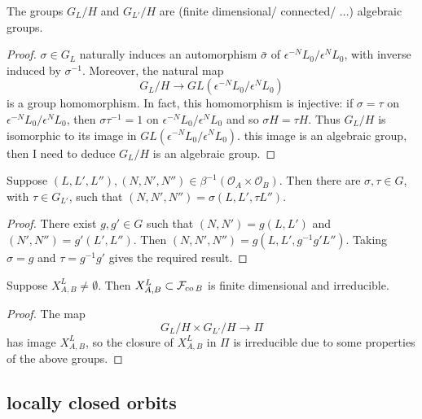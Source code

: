 \documentclass[a4paper, 11pt]{report}
\begin{document}
\begin{lemma}
The groups $G_L/H$ and $G_{L'}/H$ are (finite dimensional/ connected/ ...) algebraic groups.
\end{lemma}
\begin{proof}
$\sigma\in G_L$ naturally induces an automorphism $\bar{\sigma}$ of $\epsilon^{-N} L_0/{\epsilon^N L_0}$, with inverse induced by $\sigma^{-1}$. Moreover, the natural map
\begin{equation*}
G_L/H \to GL(\epsilon^{-N}L_0/{\epsilon^N L_0})
\end{equation*}
is a group homomorphism. In fact, this homomorphism is injective: if $\sigma = \tau$ on $\epsilon^{-N}L_0/{\epsilon^N L_0}$, then $\sigma\tau^{-1} = 1$ on $\epsilon^{-N}L_0/{\epsilon^N L_0}$ and so $\sigma H = \tau H$. Thus $G_L/H$ is isomorphic to its image in $GL(\epsilon^{-N}L_0/{\epsilon^N L_0})$. {\color{red}this image is an algebraic group, then I need to deduce $G_L/H$ is an algebraic group.} 
\end{proof}

\begin{lemma}
Suppose $(L,L',L''),(N,N',N'')\in\beta^{-1}(\mathcal{O}_A\times\mathcal{O}_B)$. Then there are $\sigma,\tau\in G$, with $\tau\in G_{L'}$, such that $(N,N',N'') = \sigma(L,L',\tau L'')$.
\end{lemma}
\begin{proof}
There exist $g,g'\in G$ such that $(N,N') = g(L,L')$ and $(N',N'') = g'(L',L'')$. Then $(N,N',N'') = g(L,L',g^{-1}g' L'')$. Taking $\sigma = g$ and $\tau = g^{-1}g'$ gives the required result.
\end{proof}

\begin{proposition}\label{lemma:irreducibility-orbit-product}
Suppose $X_{A,B}^L\neq\emptyset$. Then $X_{A,B}^L\subset\mathcal{F}_{\operatorname{co}{B}}$ is finite dimensional and irreducible.
\end{proposition}
\begin{proof}
The map
\begin{equation*}
G_L/H\times G_{L'}/H\to\Pi
\end{equation*}
has image $X_{A,B}^L$, so the closure of $X_{A,B}^L$ in $\Pi$ is irreducible {\color{red}due to some properties of the above groups.}
\end{proof}

\subsection{locally closed orbits}
\end{document}
